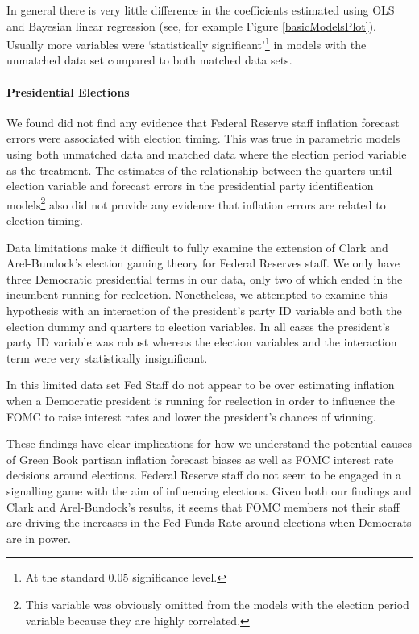 \documentclass[a4paper]{article}\usepackage{graphicx, color}
\begin{document}
In general there is very little difference in the coefficients estimated using OLS and Bayesian linear regression (see, for example Figure \ref{basicModelsPlot}). Usually more variables were `statistically significant'\footnote{At the standard 0.05 significance level.} in models with the unmatched data set compared to both matched data sets.

\paragraph{Presidential Elections}

We found did not find any evidence that Federal Reserve staff inflation forecast errors were associated with election timing. This was true in parametric models using both unmatched data and matched data where the election period variable as the treatment. The estimates of the relationship between the quarters until election variable and forecast errors in the presidential party identification models\footnote{This variable was obviously omitted from the models with the election period variable because they are highly correlated.} also did not provide any evidence that inflation errors are related to election timing. 

Data limitations make it difficult to fully examine the extension of Clark and Arel-Bundock's \citeyearpar{Clark2011} election gaming theory for Federal Reserves staff. We only have three Democratic presidential terms in our data, only two of which ended in the incumbent running for reelection. Nonetheless, we attempted to examine this hypothesis with an interaction of the president's party ID variable and both the election dummy and quarters to election variables. In all cases the president's party ID variable was robust whereas the election variables and the interaction term were very statistically insignificant.

In this limited data set Fed Staff do not appear to be over estimating inflation when a Democratic president is running for reelection in order to influence the FOMC to raise interest rates and lower the president's chances of winning. 

These findings have clear implications for how we understand the potential causes of Green Book partisan inflation forecast biases as well as FOMC interest rate decisions around elections. Federal Reserve staff do not seem to be engaged in a signalling game with the aim of influencing elections. Given both our findings and Clark and Arel-Bundock's results, it seems that FOMC members not their staff are driving the increases in the Fed Funds Rate around elections when Democrats are in power. 
\end{document}
